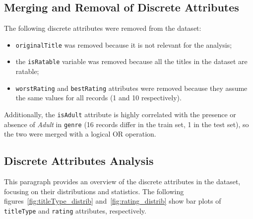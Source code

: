 \subsection{Merging and Removal of Discrete Attributes}\label{subsec:var_elim_discrete}
The following discrete attributes were removed from the dataset:
\begin{itemize}
    \item \texttt{originalTitle} was removed because it is not relevant for the analysis;
    \item the \texttt{isRatable} variable was removed because all the titles in the dataset are ratable;
    \item \texttt{worstRating} and \texttt{bestRating} attributes were removed because they assume the same values for all records (1 and 10 respectively).
\end{itemize}

Additionally, the \texttt{isAdult} attribute is highly correlated with the presence or absence of
\textit{Adult} in \texttt{genre} (16 records differ in the train set, 1 in the test set), so the two were
merged with a logical OR operation.



\subsection{Discrete Attributes Analysis}
This paragraph provides an overview of the discrete attributes in the dataset, focusing on their distributions and statistics.
The following figures~\ref{fig:titleType_distrib} and~\ref{fig:rating_distrib} show bar plots of \texttt{titleType} and \texttt{rating} attributes, respectively.\\


